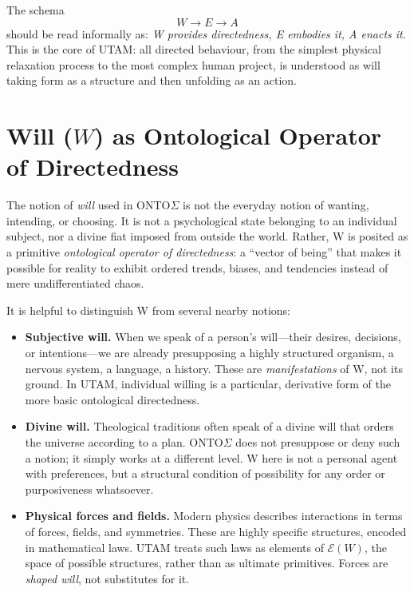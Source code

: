 \documentclass[12pt,a4paper]{report}
\newcommand{\Will}{W}
\newcommand{\Struct}{E}
\newcommand{\Act}{A}
\begin{document}
The schema
\[
    \Will \to \Struct \to \Act
\]
should be read informally as: \emph{\Will{} provides directedness, \Struct{} embodies it, \Act{} enacts it}. This is the core of UTAM: all directed behaviour, from the simplest physical relaxation process to the most complex human project, is understood as will taking form as a structure and then unfolding as an action.

\section{Will (\(W\)) as Ontological Operator of Directedness}

The notion of \emph{will} used in ONTO$\Sigma$ is not the everyday notion of wanting, intending, or choosing. It is not a psychological state belonging to an individual subject, nor a divine fiat imposed from outside the world. Rather, \Will{} is posited as a primitive \emph{ontological operator of directedness}: a ``vector of being'' that makes it possible for reality to exhibit ordered trends, biases, and tendencies instead of mere undifferentiated chaos.

It is helpful to distinguish \Will{} from several nearby notions:

\begin{itemize}[leftmargin=2em]
    \item \textbf{Subjective will.} When we speak of a person's will---their desires, decisions, or intentions---we are already presupposing a highly structured organism, a nervous system, a language, a history. These are \emph{manifestations} of \Will{}, not its ground. In UTAM, individual willing is a particular, derivative form of the more basic ontological directedness.
    \item \textbf{Divine will.} Theological traditions often speak of a divine will that orders the universe according to a plan. ONTO$\Sigma$ does not presuppose or deny such a notion; it simply works at a different level. \Will{} here is not a personal agent with preferences, but a structural condition of possibility for any order or purposiveness whatsoever.
    \item \textbf{Physical forces and fields.} Modern physics describes interactions in terms of forces, fields, and symmetries. These are highly specific structures, encoded in mathematical laws. UTAM treats such laws as elements of \(\mathcal{E}(\Will)\), the space of possible structures, rather than as ultimate primitives. Forces are \emph{shaped will}, not substitutes for it.
\end{itemize}
\end{document}
